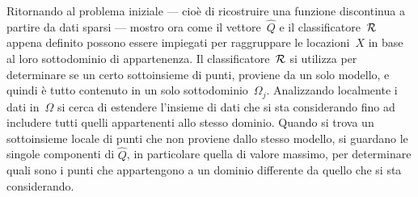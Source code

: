 Ritornando al problema iniziale --- cioè di ricostruire una funzione discontinua a partire da dati sparsi --- mostro ora come il vettore~$\widehat Q$ e il classificatore~$\cal R$ appena definito possono essere impiegati per raggruppare le locazioni~$X$ in base al loro sottodominio di appartenenza.
Il classificatore~$\cal R$ si utilizza per determinare se un certo sottoinsieme di punti,  proviene da un solo modello, e quindi è tutto contenuto in un solo sottodominio~$\Omega_j$.
Analizzando localmente i dati in~$\Omega$ si cerca di estendere l’insieme di dati che si sta considerando fino ad includere tutti quelli appartenenti allo stesso dominio.
Quando si trova un sottoinsieme locale di punti che non proviene dallo stesso modello, si guardano le singole componenti di $\widehat Q$, in particolare quella di valore massimo, per determinare quali sono i punti che appartengono a un dominio differente da quello che si sta considerando.



